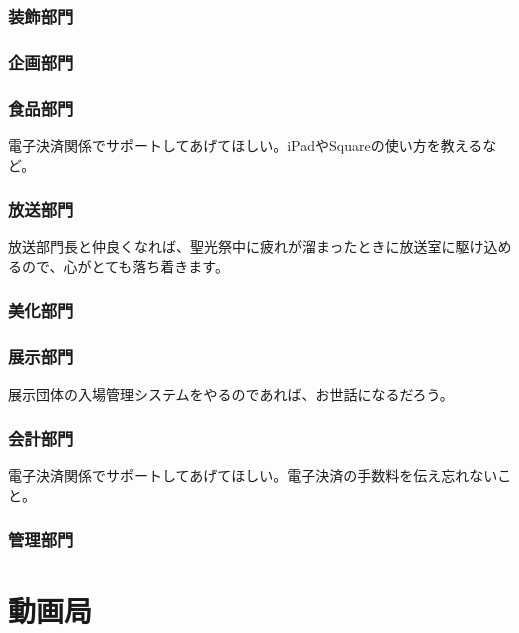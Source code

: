 \documentclass[dvipdfmx,jb5]{jarticle}
\begin{document}
\subsubsection{装飾部門}


\subsubsection{企画部門}


\subsubsection{食品部門}
電子決済関係でサポートしてあげてほしい。iPadやSquareの使い方を教えるなど。


\subsubsection{放送部門}
放送部門長と仲良くなれば、聖光祭中に疲れが溜まったときに放送室に駆け込めるので、心がとても落ち着きます。

\subsubsection{美化部門}


\subsubsection{展示部門}
展示団体の入場管理システムをやるのであれば、お世話になるだろう。

\subsubsection{会計部門}
電子決済関係でサポートしてあげてほしい。電子決済の手数料を伝え忘れないこと。

\subsubsection{管理部門}

\section{動画局}
\end{document}
